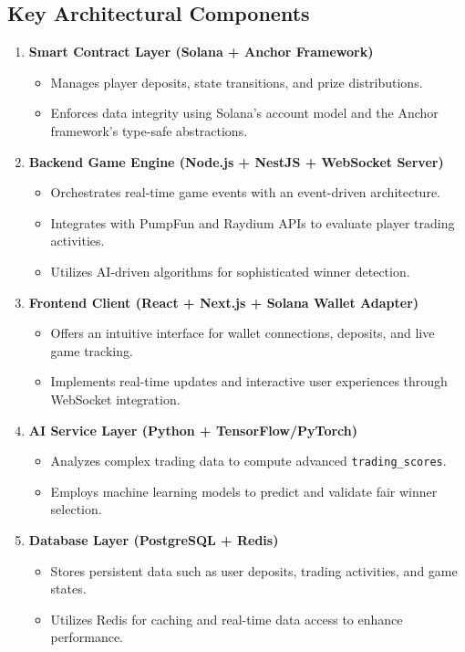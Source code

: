 \documentclass[11pt,a4paper]{article}
\begin{document}
\subsection{Key Architectural Components}

\begin{enumerate}
    \item \textbf{Smart Contract Layer (Solana + Anchor Framework)}
    \begin{itemize}
        \item Manages player deposits, state transitions, and prize distributions.
        \item Enforces data integrity using Solana's account model and the Anchor framework's type-safe abstractions.
    \end{itemize}
    
    \item \textbf{Backend Game Engine (Node.js + NestJS + WebSocket Server)}
    \begin{itemize}
        \item Orchestrates real-time game events with an event-driven architecture.
        \item Integrates with PumpFun and Raydium APIs to evaluate player trading activities.
        \item Utilizes AI-driven algorithms for sophisticated winner detection.
    \end{itemize}
    
    \item \textbf{Frontend Client (React + Next.js + Solana Wallet Adapter)}
    \begin{itemize}
        \item Offers an intuitive interface for wallet connections, deposits, and live game tracking.
        \item Implements real-time updates and interactive user experiences through WebSocket integration.
    \end{itemize}
    
    \item \textbf{AI Service Layer (Python + TensorFlow/PyTorch)}
    \begin{itemize}
        \item Analyzes complex trading data to compute advanced \texttt{trading\_scores}.
        \item Employs machine learning models to predict and validate fair winner selection.
    \end{itemize}
    
    \item \textbf{Database Layer (PostgreSQL + Redis)}
    \begin{itemize}
        \item Stores persistent data such as user deposits, trading activities, and game states.
        \item Utilizes Redis for caching and real-time data access to enhance performance.
    \end{itemize}
\end{enumerate}
\end{document}
